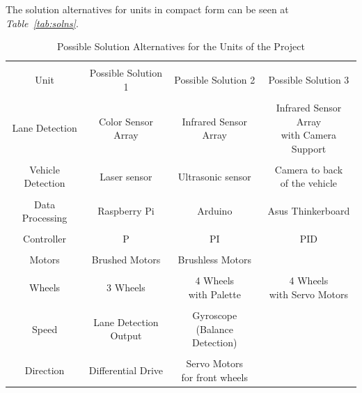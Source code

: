 \documentclass[a4paper,12pt]{article}
\begin{document}
		The solution alternatives for units in compact form can be seen at \textit{Table~\ref{tab:solns}}.
	
\begin{table}[H]
  \centering
 	 \caption{Possible Solution Alternatives for the  Units of the Project}\vspace{-.2cm}
    \begin{tabular}{| c | c  c  c |}
    \hline 
    	&&& \\
       Unit & Possible Solution 1 & Possible Solution 2  & Possible Solution 3 \\ \hline
       &&& \\
       Lane Detection  & Color Sensor Array & Infrared Sensor Array & \specialcell{ Infrared Sensor  Array \\ with  Camera Support}  \\
       \hline 
       &&& \\
       Vehicle Detection & Laser sensor  & Ultrasonic sensor & \specialcell{Camera to back \\of the vehicle } \\

       \hline 
       &&& \\
       Data Processing & Raspberry Pi & Arduino & Asus Thinkerboard \\ 
       \hline 
       &&& \\
       Controller & P & PI & PID \\ 
       \hline 
       &&& \\
       Motors & Brushed Motors & Brushless Motors & \\
       \hline 
       &&& \\
		Wheels & 3 Wheels  &  \specialcell{4 Wheels \\with Palette}  & \specialcell{4 Wheels \\with Servo Motors}   \\
		\hline 
		&&& \\
		Speed & \specialcell{Lane Detection \\Output} & \specialcell{Gyroscope \\(Balance Detection)}  & \\
		\hline 
		&&& \\
		Direction & Differential Drive & \specialcell{Servo Motors \\ for front wheels}   &
       

\end{tabular}
\end{table}
\end{document}

